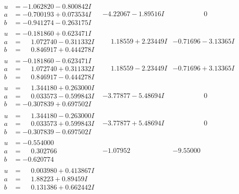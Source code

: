 \documentclass[1p]{elsarticle_modified}
\theoremstyle{definition}
\begin{document}
$$\begin{array}{c|c|c}
\begin{aligned}
u &= -1.062820 - 0.800842 I \\
a &= -0.700193 + 0.073534 I \\
b &= -0.941274 - 0.263175 I\end{aligned}
 & -4.22067 - 1.89516 I & \phantom{-0.000000 } 0 \\ \hline\begin{aligned}
u &= -0.181860 + 0.623471 I \\
a &= \phantom{-}1.072740 - 0.311332 I \\
b &= \phantom{-}0.846917 + 0.444278 I\end{aligned}
 & \phantom{-}1.18559 + 2.23449 I & -0.71696 - 3.13365 I \\ \hline\begin{aligned}
u &= -0.181860 - 0.623471 I \\
a &= \phantom{-}1.072740 + 0.311332 I \\
b &= \phantom{-}0.846917 - 0.444278 I\end{aligned}
 & \phantom{-}1.18559 - 2.23449 I & -0.71696 + 3.13365 I \\ \hline\begin{aligned}
u &= \phantom{-}1.344180 + 0.263000 I \\
a &= \phantom{-}0.033573 - 0.599843 I \\
b &= -0.307839 + 0.697502 I\end{aligned}
 & -3.77877 - 5.48694 I & \phantom{-0.000000 } 0 \\ \hline\begin{aligned}
u &= \phantom{-}1.344180 - 0.263000 I \\
a &= \phantom{-}0.033573 + 0.599843 I \\
b &= -0.307839 - 0.697502 I\end{aligned}
 & -3.77877 + 5.48694 I & \phantom{-0.000000 } 0 \\ \hline\begin{aligned}
u &= -0.554000\phantom{ +0.000000I} \\
a &= \phantom{-}0.302766\phantom{ +0.000000I} \\
b &= -0.620774\phantom{ +0.000000I}\end{aligned}
 & -1.07952\phantom{ +0.000000I} & -9.55000\phantom{ +0.000000I} \\ \hline\begin{aligned}
u &= \phantom{-}0.003980 + 0.413867 I \\
a &= \phantom{-}1.88223 + 0.89459 I \\
b &= \phantom{-}0.131386 + 0.662442 I\end{aligned}

\end{array}$$
\end{document}
